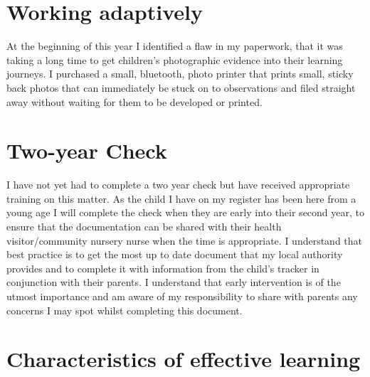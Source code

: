 \documentclass[10pt,a4paper]{report}
\begin{document}
\section{Working adaptively}

At the beginning of this year I identified a flaw in my paperwork, that it was taking a long time to get children's photographic evidence into their learning journeys. I purchased a small, bluetooth, photo printer that prints small, sticky back photos that can immediately be stuck on to observations and filed straight away without waiting for them to be developed or printed.

\section{Two-year Check}

I have not yet had to complete a two year check but have received appropriate training on this matter. As the child I have on my register has been here from a young age I will complete the check when they are early into their second year, to ensure that the documentation can be shared with their health visitor/community nursery nurse when the time is appropriate. I understand that best practice is to get the most up to date document that my local authority provides and to complete it with information from the child's tracker in conjunction with their parents. I understand that early intervention is of the utmost importance and am aware of my responsibility to share with parents any concerns I may spot whilst completing this document.

\section{Characteristics of effective learning}
\end{document}

